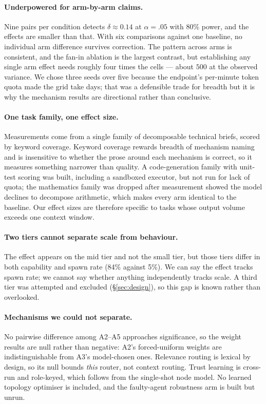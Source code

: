 \documentclass[10pt]{article}
\begin{document}
\paragraph{Underpowered for arm-by-arm claims.}
Nine pairs per condition detects $\delta \approx 0.14$ at $\alpha = .05$ with
$80\%$ power, and the effects are smaller than that. With six comparisons
against one baseline, no individual arm difference survives correction. The
pattern across arms is consistent, and the fan-in ablation is the largest
contrast, but establishing any single arm effect needs roughly four times the
cells --- about $500$ at the observed variance. We chose three seeds over five
because the endpoint's per-minute token quota made the grid take days; that was
a defensible trade for breadth but it is why the mechanism results are
directional rather than conclusive.

\paragraph{One task family, one effect size.}
Measurements come from a single family of decomposable technical briefs, scored
by keyword coverage. Keyword coverage rewards breadth of mechanism naming and is
insensitive to whether the prose around each mechanism is correct, so it
measures something narrower than quality. A code-generation family with
unit-test scoring was built, including a sandboxed executor, but not run for
lack of quota; the mathematics family was dropped after measurement showed the
model declines to decompose arithmetic, which makes every arm identical to the
baseline. Our effect sizes are therefore specific to tasks whose output volume
exceeds one context window.

\paragraph{Two tiers cannot separate scale from behaviour.}
The effect appears on the mid tier and not the small tier, but those tiers differ
in both capability and spawn rate (84\% against 5\%). We can say the effect
tracks spawn rate; we cannot say whether anything independently tracks scale. A
third tier was attempted and excluded (\S\ref{sec:design}), so this gap is known
rather than overlooked.

\paragraph{Mechanisms we could not separate.}
No pairwise difference among A2--A5 approaches significance, so the weight
results are null rather than negative: A2's forced-uniform weights are
indistinguishable from A3's model-chosen ones. Relevance routing is lexical by
design, so its null bounds \emph{this} router, not context routing. Trust
learning is cross-run and role-keyed, which follows from the single-shot node
model. No learned topology optimiser is included, and the faulty-agent
robustness arm is built but unrun.
\end{document}
